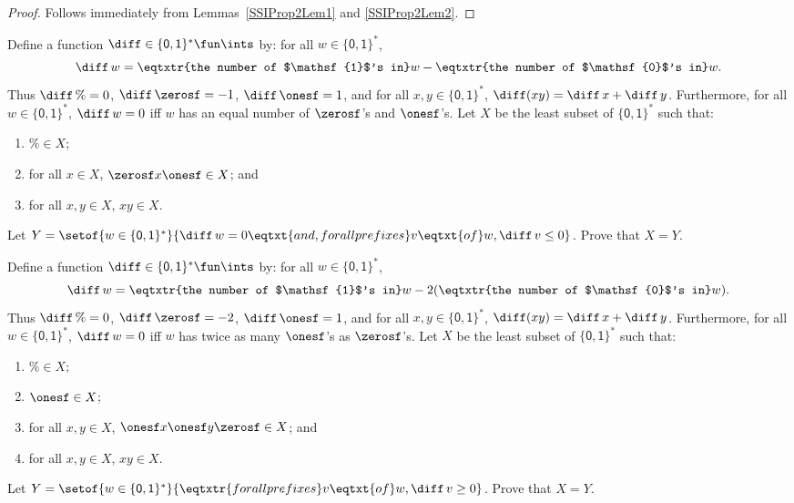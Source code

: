 \begin{proof}
Follows immediately from Lemmas~\ref{SSIProp2Lem1} and \ref{SSIProp2Lem2}.
\end{proof}

\begin{exercise}
Define a function $\diff\in\{\mathsf{0,1}\}^*\fun\ints$ by:
for all $w\in\{\mathsf{0,1}\}^*$,
\begin{displaymath}
\diff\,w =
\eqtxtr{the number of $\mathsf{1}$'s in}w -
\eqtxtr{the number of $\mathsf{0}$'s in}w .
\end{displaymath}
Thus $\diff\,\%=0$, $\diff\,\zerosf = -1$, $\diff\,\onesf = 1$, and
for all $x,y\in\{\mathsf{0,1}\}^*$, $\diff(xy) = \diff\,x + \diff\,y$.
Furthermore, for all $w\in\{\mathsf{0,1}\}^*$, $\diff\,w=0$ iff $w$
has an equal number of $\zerosf$'s and $\onesf$'s.
Let $X$ be the least subset of $\{\mathsf{0,1}\}^*$ such that:
\begin{enumerate}[\quad(1)]
\item $\%\in X$;

\item for all $x\in X$, $\zerosf x\onesf\in X$; and

\item for all $x,y\in X$, $xy\in X$.
\end{enumerate}
Let $Y=\setof{w\in\{\mathsf{0,1}\}^*}{\diff\,w=0\eqtxt{and,
for all prefixes}v\eqtxt{of}w,\diff\,v\leq 0}$.
Prove that $X=Y$.
\end{exercise}

\begin{exercise}
Define a function $\diff\in\{\mathsf{0,1}\}^*\fun\ints$ by:
for all $w\in\{\mathsf{0,1}\}^*$,
\begin{displaymath}
\diff\,w =
\eqtxtr{the number of $\mathsf{1}$'s in}w -
2(\eqtxtr{the number of $\mathsf{0}$'s in}w) .
\end{displaymath}
Thus $\diff\,\%=0$,
$\diff\,\zerosf = -2$,
$\diff\,\onesf = 1$, and
for all $x,y\in\{\mathsf{0,1}\}^*$, $\diff(xy) = \diff\,x + \diff\,y$.
Furthermore, for all $w\in\{\mathsf{0,1}\}^*$,
$\diff\,w=0$ iff $w$ has twice as many $\onesf$'s as $\zerosf$'s.
Let $X$ be the least subset of $\{\mathsf{0,1}\}^*$ such that:
\begin{enumerate}[\quad(1)]
\item $\%\in X$;

\item $\onesf\in X$;

\item for all $x,y\in X$, $\onesf x\onesf y\zerosf\in X$; and

\item for all $x,y\in X$, $xy\in X$.
\end{enumerate}
Let $Y=\setof{w\in\{\mathsf{0,1}\}^*}{\eqtxtr{for all
prefixes}v\eqtxt{of}w,\diff\,v\geq 0}$.
Prove that $X=Y$.
\end{exercise}

